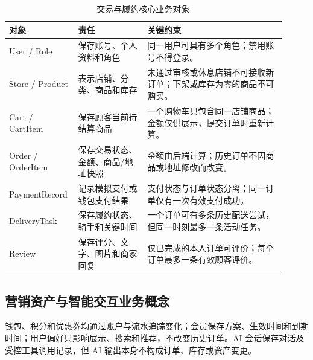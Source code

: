 \begin{longtable}{|L{0.19\linewidth}|L{0.24\linewidth}|L{0.48\linewidth}|}
\caption{交易与履约核心业务对象}\label{tab:domain-objects}\\ \hline
\textbf{对象} & \textbf{责任} & \textbf{关键约束} \\ \hline
User / Role & 保存账号、个人资料和角色 & 同一用户可具有多个角色；禁用账号不得登录。 \\ \hline
Store / Product & 表示店铺、分类、商品和库存 & 未通过审核或休息店铺不可接收新订单；下架或库存为零的商品不可购买。 \\ \hline
Cart / CartItem & 保存顾客当前待结算商品 & 一个购物车只包含同一店铺商品；金额仅供展示，提交订单时重新计算。 \\ \hline
Order / OrderItem & 保存交易状态、金额、商品/地址快照 & 金额由后端计算；历史订单不因商品或地址修改而改变。 \\ \hline
Payment\-Record & 记录模拟支付或钱包支付结果 & 支付状态与订单状态分离；同一订单仅有一次有效支付成功。 \\ \hline
DeliveryTask & 保存履约状态、骑手和关键时间 & 一个订单可有多条历史配送尝试，但同一时刻最多一条活动任务。 \\ \hline
Review & 保存评分、文字、图片和商家回复 & 仅已完成的本人订单可评价；每个订单最多一条有效顾客评价。 \\ \hline
\end{longtable}


\subsection{营销资产与智能交互业务概念}

钱包、积分和优惠券均通过账户与流水追踪变化；会员保存方案、生效时间和到期时间；用户偏好只影响展示、搜索和推荐，不改变历史订单。AI 会话保存对话及受控工具调用记录，但 AI 输出本身不构成订单、库存或资产变更。

